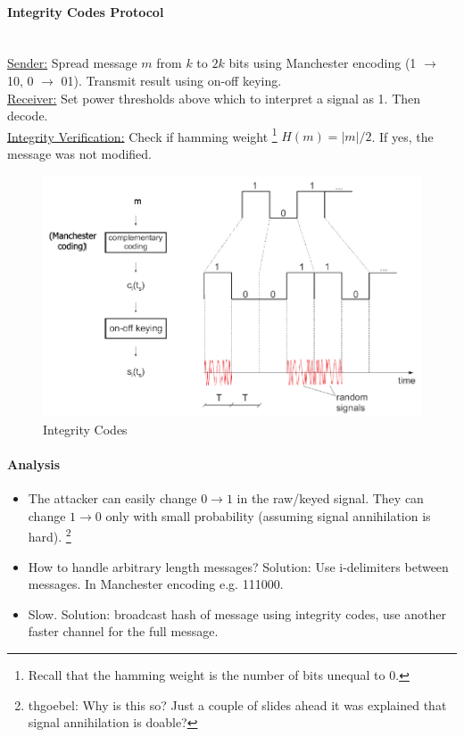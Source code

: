 \paragraph{Integrity Codes Protocol} \mbox{}\\
\underline{Sender:}
Spread message $m$ from $k$ to $2k$ bits using Manchester encoding (1 $\rightarrow$ 10, 0 $\rightarrow$ 01).
Transmit result using on-off keying.
\\
\underline{Receiver:}
Set power thresholds above which to interpret a signal as 1. Then decode.
\\
\underline{Integrity Verification:}
Check if hamming weight%
\footnote{Recall that the hamming weight is the number of bits unequal to 0.}
$H(m)=|m|/2$. If yes, the message was not modified.

\begin{figure}
	\centering
	\includegraphics[scale=0.4]{images/7-integrity-code.png}
	\caption{Integrity Codes}
	\label{fig:integrity-code}
\end{figure}

\paragraph{Analysis}
\begin{itemize}
	\item The attacker can easily change $0 \rightarrow 1$ in the raw/keyed signal.
	They can change $1 \rightarrow 0$ only with small probability (assuming signal annihilation is hard).%
	\footnote{thgoebel: Why is this so? Just a couple of slides ahead it was explained that signal annihilation is doable?}
	\item How to handle arbitrary length messages?
	Solution: Use i-delimiters between messages. In Manchester encoding e.g. 111000.
	\item Slow. Solution: broadcast hash of message using integrity codes, use another faster channel for the full message.
\end{itemize}

